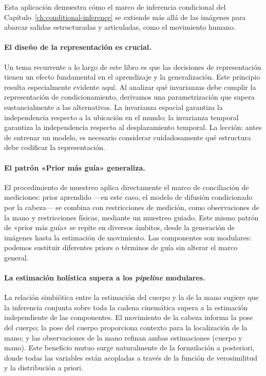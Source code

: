 \documentclass[../../book-main_es.tex]{subfiles}
\begin{document}
Esta aplicación demuestra cómo el marco de inferencia condicional
del Capítulo~\ref{ch:conditional-inference} se extiende más allá de las imágenes para abarcar
salidas estructuradas y articuladas, como el movimiento humano.

\paragraph{El diseño de la representación es crucial.}
Un tema recurrente a lo largo de este libro es que las decisiones de representación
tienen un efecto fundamental en el aprendizaje y la generalización. Este principio
resulta especialmente evidente aquí. Al analizar qué invarianzas debe
cumplir la representación de condicionamiento, derivamos una
parametrización que supera sustancialmente a las alternativas. La invarianza espacial
garantiza la independencia respecto a la ubicación en el mundo; la invarianza temporal
garantiza la independencia respecto al desplazamiento temporal. La lección: antes de
entrenar un modelo, es necesario considerar cuidadosamente qué estructura
debe codificar la representación.

\paragraph{El patrón «Prior más guía» generaliza.}
El procedimiento de muestreo aplica directamente el marco de
conciliación de mediciones: prior aprendido ---en este caso, el
modelo de difusión condicionado por la cabeza--- se combina con
restricciones de medición, como observaciones de la mano y 
restricciones físicas, mediante un muestreo guiado. Este mismo patrón de
«prior más guía» se repite en diversos ámbitos, desde la
generación de imágenes hasta la estimación de movimiento. Las
componentes son modulares: podemos sustituir diferentes priors o
términos de guía sin alterar el marco general.

\paragraph{La estimación holística supera a los \textit{pipeline} modulares.}
La relación simbiótica entre la estimación del cuerpo y la de la mano sugiere
que la inferencia conjunta sobre toda la cadena cinemática supera a
la estimación independiente de las componentes. El movimiento de la cabeza informa la pose del cuerpo;
la pose del cuerpo proporciona contexto para la localización de la mano; y las observaciones de la mano
refinan ambas estimaciones (cuerpo y mano). Este beneficio mutuo surge
naturalmente de la formulación a posteriori, donde todas las variables están
acopladas a través de la función de verosimilitud y la distribución a priori.
\end{document}
